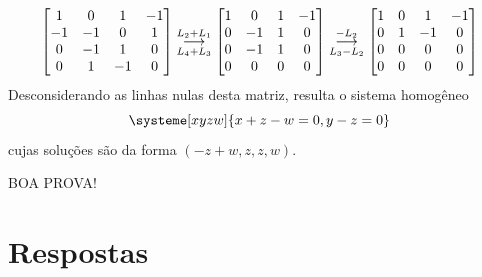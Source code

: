 \documentclass[12pt,a4paper]{article}
\newcommand{\grstep}[2][\relax]{%
   \ensuremath{\mathrel{
       {\mathop{\longrightarrow}\limits^{#2\mathstrut}_{
                                     \begin{subarray}{l} #1 \end{subarray}}}}}}
\begin{document}
\begin{ExerciseList}
\begin{align*}
\begin{bmatrix}
1 & 0 & 1 & -1 \\
-1 & -1 & 0 & 1 \\
0 & -1 & 1 & 0 \\
0 & 1 & -1 & 0
\end{bmatrix}
\grstep[ L_4 + L_3 ]{ L_2+L_1}
\begin{bmatrix}
1 & 0 & 1 & -1 \\
0 & -1 & 1 & 0 \\
0 & -1 & 1 & 0 \\
0 & 0 & 0 & 0
\end{bmatrix}
\grstep[ L_3 - L_2 ]{ -L_2 }
\begin{bmatrix}
1 & 0 & 1 & -1 \\
0 & 1 & -1 & 0 \\
0 & 0 & 0 & 0 \\
0 & 0 & 0 & 0
\end{bmatrix}
\end{align*}
Desconsiderando as linhas nulas desta matriz, resulta o sistema homogêneo
\[
\systeme[xyzw]{
x+z-w = 0,
y-z = 0
}
\]
cujas soluções são da forma $(-z+w,z,z,w)$.

\end{ExerciseList}

\begin{center}
BOA PROVA!
\end{center}

\newpage
\restoregeometry
\section*{Respostas}
\shipoutAnswer
\end{document}
